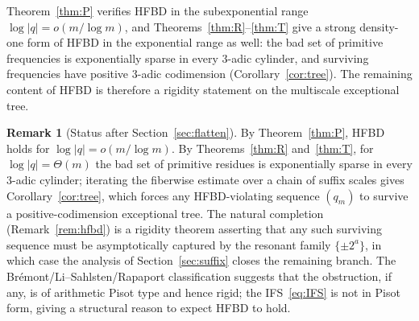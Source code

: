 \documentclass[11pt,a4paper]{amsart}
\theoremstyle{plain}
\theoremstyle{definition}
\newtheorem{remark}[theorem]{Remark}
\begin{document}
Theorem~\ref{thm:P} verifies HFBD in the subexponential range
$\log|q|=o(m/\log m)$, and Theorems~\ref{thm:R}--\ref{thm:T} give a strong
density-one form of HFBD in the exponential range as well: the bad set
of primitive frequencies is exponentially sparse in every $3$-adic
cylinder, and surviving frequencies have positive $3$-adic codimension
(Corollary~\ref{cor:tree}).
The remaining content of HFBD is therefore a rigidity statement on the
multiscale exceptional tree.

\begin{remark}[Status after Section~\ref{sec:flatten}]
By Theorem~\ref{thm:P}, HFBD holds for $\log|q|=o(m/\log m)$.
By Theorems~\ref{thm:R} and~\ref{thm:T}, for $\log|q|=\Theta(m)$ the
bad set of primitive residues is exponentially sparse in every $3$-adic
cylinder; iterating the fiberwise estimate over a chain of suffix scales
gives Corollary~\ref{cor:tree}, which forces any HFBD-violating sequence
$(q_m)$ to survive a positive-codimension exceptional tree.
The natural completion (Remark~\ref{rem:hfbd}) is a rigidity theorem
asserting that any such surviving sequence must be asymptotically
captured by the resonant family $\{\pm 2^a\}$, in which case the analysis
of Section~\ref{sec:suffix} closes the remaining branch.
The Br\'emont/Li--Sahlsten/Rapaport classification \cite{Bremont,LiSahlsten,Rapaport}
suggests that the obstruction, if any, is of arithmetic Pisot type and
hence rigid; the IFS~\eqref{eq:IFS} is not in Pisot form, giving a
structural reason to expect HFBD to hold.
\end{remark}
\end{document}
